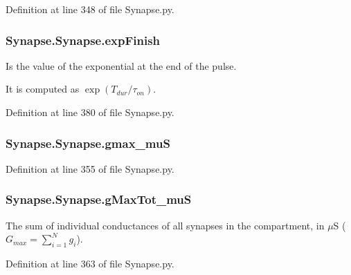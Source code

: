 Definition at line 348 of file Synapse.\+py.

\subsubsection[{\texorpdfstring{exp\+Finish}{expFinish}}]{\setlength{\rightskip}{0pt plus 5cm}Synapse.\+Synapse.\+exp\+Finish}\hypertarget{class_synapse_1_1_synapse_aa9ae256b272ceb8e9e4a931a9cd5d163}{}\label{class_synapse_1_1_synapse_aa9ae256b272ceb8e9e4a931a9cd5d163}


Is the value of the exponential at the end of the pulse. 

It is computed as $\exp(T_{dur}/\tau_{on})$. 

Definition at line 380 of file Synapse.\+py.

\subsubsection[{\texorpdfstring{gmax\+\_\+muS}{gmax_muS}}]{\setlength{\rightskip}{0pt plus 5cm}Synapse.\+Synapse.\+gmax\+\_\+muS}\hypertarget{class_synapse_1_1_synapse_a7922dac4765183cb6052905cc0d251cb}{}\label{class_synapse_1_1_synapse_a7922dac4765183cb6052905cc0d251cb}


Definition at line 355 of file Synapse.\+py.

\subsubsection[{\texorpdfstring{g\+Max\+Tot\+\_\+muS}{gMaxTot_muS}}]{\setlength{\rightskip}{0pt plus 5cm}Synapse.\+Synapse.\+g\+Max\+Tot\+\_\+muS}\hypertarget{class_synapse_1_1_synapse_a470750725ecb176e048a973b9dc23ea3}{}\label{class_synapse_1_1_synapse_a470750725ecb176e048a973b9dc23ea3}


The sum of individual conductances of all synapses in the compartment, in $\mu$S ( $G_{max} = \limits\sum_{i=1}^Ng_i$). 



Definition at line 363 of file Synapse.\+py.

